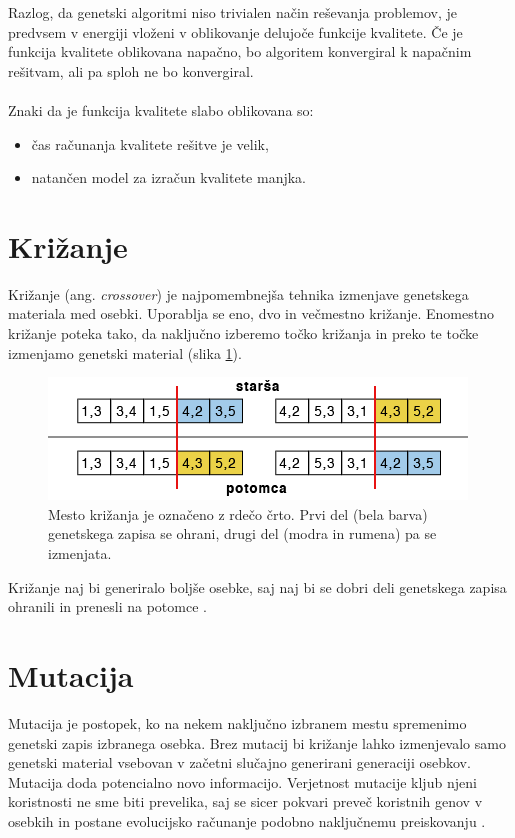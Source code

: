 \documentclass[a4paper, 12pt]{book}
\begin{document}
Razlog, da genetski algoritmi niso trivialen na\v cin re\v sevanja problemov, je predvsem v energiji vlo\v zeni v oblikovanje delujo\v ce funkcije kvalitete. \v Ce je funkcija kvalitete oblikovana napa\v cno, bo algoritem konvergiral k napa\v cnim re\v sitvam, ali pa sploh ne bo konvergiral.\\\\
Znaki da je funkcija kvalitete slabo oblikovana so:
\begin{itemize}
\item \v cas ra\v cunanja kvalitete re\v sitve je velik,
\item natan\v cen model za izra\v cun kvalitete manjka.
\end{itemize}

\section{Kri\v zanje}
\label{seq:krizanje}
Kri\v zanje (ang. \textit{crossover}) je najpomembnej\v sa tehnika izmenjave genetskega materiala med osebki. Uporablja se eno, dvo in ve\v cmestno kri\v zanje. Enomestno kri\v zanje poteka tako, da naklju\v cno izberemo to\v cko kri\v zanja in preko te to\v cke izmenjamo genetski material (slika \ref{krizanje}).

\begin{figure}
\begin{center}
\includegraphics[scale=0.70]{krizanje.png}
\end{center}
\caption{Mesto kri\v zanja je ozna\v ceno z rde\v co \v crto. Prvi del (bela barva) genetskega zapisa se ohrani, drugi del (modra in rumena) pa se izmenjata.}
\label{krizanje}
\end{figure}

Kri\v zanje naj bi generiralo bolj\v se osebke, saj naj bi se dobri deli genetskega zapisa ohranili in prenesli na potomce \cite{inteligentni sistemi}.

\section{Mutacija}
Mutacija je postopek, ko na nekem naklju\v cno izbranem mestu spremenimo genetski zapis izbranega osebka. 
Brez mutacij bi kri\v zanje lahko izmenjevalo samo genetski material vsebovan v za\v cetni slu\v cajno generirani generaciji osebkov. Mutacija doda potencialno novo informacijo. Verjetnost mutacije kljub njeni koristnosti ne sme biti prevelika, saj se sicer pokvari preve\v c koristnih genov v osebkih in postane evolucijsko ra\v cunanje podobno naklju\v cnemu preiskovanju
\cite{inteligentni sistemi}.
\end{document}
